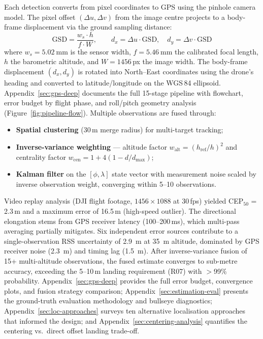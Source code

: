Each detection converts from pixel coordinates to GPS using the pinhole camera model. The pixel offset $(\Delta u, \Delta v)$ from the image centre projects to a body-frame displacement via the ground sampling distance:
\begin{equation}\label{eq:gsd-sysdesc}
  \mathrm{GSD} = \frac{w_s \cdot h}{f \cdot W},\qquad
  d_x = \Delta u \cdot \mathrm{GSD},\quad
  d_y = \Delta v \cdot \mathrm{GSD}
\end{equation}
where $w_s = \SI{5.02}{\milli\metre}$ is the sensor width, $f = \SI{5.46}{\milli\metre}$ the calibrated focal length, $h$ the barometric altitude, and $W = 1456$\,px the image width. The body-frame displacement $(d_x, d_y)$ is rotated into North--East coordinates using the drone's heading and converted to latitude/longitude on the WGS\,84 ellipsoid. Appendix~\ref{sec:gps-deep} documents the full 15-stage pipeline with flowchart, error budget by flight phase, and roll/pitch geometry analysis (Figure~\ref{fig:pipeline-flow}). Multiple observations are fused through:

\begin{itemize}
    \item \textbf{Spatial clustering} (30\,m merge radius) for multi-target tracking;
    \item \textbf{Inverse-variance weighting} --- altitude factor $w_\mathrm{alt} = (h_\mathrm{ref}/h)^2$ and centrality factor $w_\mathrm{cen} = 1 + 4(1 - d/d_\mathrm{max})$;
    \item \textbf{Kalman filter} on the $[\phi, \lambda]$ state vector with measurement noise scaled by inverse observation weight, converging within 5--10 observations.
\end{itemize}

Video replay analysis (DJI flight footage, $1456 \times 1088$ at 30\,fps) yielded CEP$_{50}$ = 2.3\,m and a maximum error of 16.5\,m (high-speed outlier). The directional elongation stems from GPS receiver latency (100--200\,ms), which multi-pass averaging partially mitigates. Six independent error sources contribute to a single-observation RSS uncertainty of \SI{2.9}{\metre} at \SI{35}{\metre} altitude, dominated by GPS receiver noise (\SI{2.3}{\metre}) and timing lag (\SI{1.5}{\metre}). After inverse-variance fusion of 15+ multi-altitude observations, the fused estimate converges to sub-metre accuracy, exceeding the 5--10\,m landing requirement (R07) with $>$99\% probability. Appendix~\ref{sec:gps-deep} provides the full error budget, convergence plots, and fusion strategy comparison; Appendix~\ref{sec:estimation-eval} presents the ground-truth evaluation methodology and bullseye diagnostics; Appendix~\ref{sec:loc-approaches} surveys ten alternative localisation approaches that informed the design; and Appendix~\ref{sec:centering-analysis} quantifies the centering vs.\ direct offset landing trade-off.

